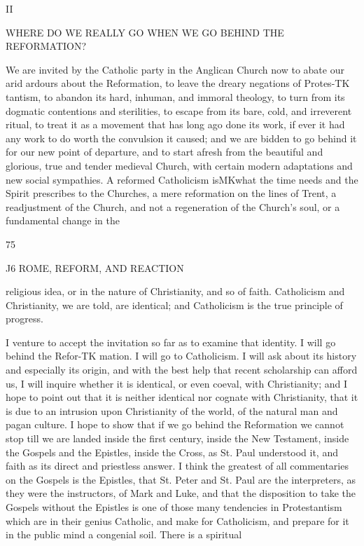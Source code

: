 \documentclass[12pt,a5paper,oneside]{book}
\begin{document}
II 



WHERE DO WE REALLY GO WHEN 
WE GO BEHIND THE REFORMATION? 

We are invited by the Catholic party in the Anglican 
Church now to abate our arid ardours about the 
Reformation, to leave the dreary negations of Protes-TK
tantism, to abandon its hard, inhuman, and immoral 
theology, to turn from its dogmatic contentions and 
sterilities, to escape from its bare, cold, and irreverent 
ritual, to treat it as a movement that has long ago 
done its work, if ever it had any work to do worth the 
convulsion it caused; and we are bidden to go behind 
it for our new point of departure, and to start afresh 
from the beautiful and glorious, true and tender 
medieval Church, with certain modern adaptations 
and new social sympathies. A reformed Catholicism 
isMKwhat the time needs and the Spirit prescribes to the 
Churches, a mere reformation on the lines of Trent, a 
readjustment of the Church, and not a regeneration 
of the Church's soul, or a fundamental change in the 

75 



J6 ROME, REFORM, AND REACTION 

religious idea, or in the nature of Christianity, and so 
of faith. Catholicism and Christianity, we are told, 
are identical; and Catholicism is the true principle 
of progress. 

I venture to accept the invitation so far as to 
examine that identity. I will go behind the Refor-TK
mation. I will go to Catholicism. I will ask about 
its history and especially its origin, and with the best 
help that recent scholarship can afford us, I will 
inquire whether it is identical, or even coeval, with 
Christianity; and I hope to point out that it is 
neither identical nor cognate with Christianity, that 
it is due to an intrusion upon Christianity of the 
world, of the natural man and pagan culture. I hope 
to show that if we go behind the Reformation we 
cannot stop till we are landed inside the first century, 
inside the New Testament, inside the Gospels and 
the Epistles, inside the Cross, as St. Paul understood 
it, and faith as its direct and priestless answer. I 
think the greatest of all commentaries on the Gospels 
is the Epistles, that St. Peter and St. Paul are the 
interpreters, as they were the instructors, of Mark and 
Luke, and that the disposition to take the Gospels 
without the Epistles is one of those many tendencies 
in Protestantism which are in their genius Catholic, 
and make for Catholicism, and prepare for it in the 
public mind a congenial soil. There is a spiritual 
\end{document}
